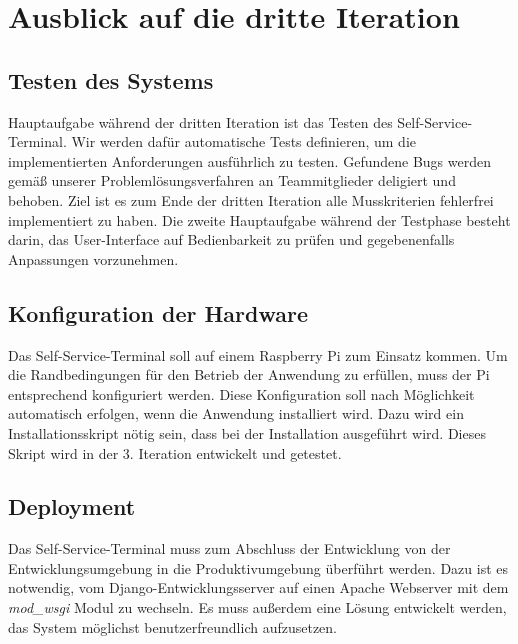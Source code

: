 \section{Ausblick auf die dritte Iteration}
\subsection{Testen des Systems}
Hauptaufgabe während der dritten Iteration ist das Testen des Self-Service-Terminal. Wir werden dafür automatische Tests definieren, um die implementierten Anforderungen ausführlich zu testen. Gefundene Bugs werden gemäß unserer Problemlösungsverfahren an Teammitglieder deligiert und behoben. Ziel ist es zum Ende der dritten Iteration alle Musskriterien fehlerfrei implementiert zu haben. Die zweite Hauptaufgabe während der Testphase besteht darin, das User-Interface auf Bedienbarkeit zu prüfen und gegebenenfalls Anpassungen vorzunehmen.\par
\vspace{0,5cm}
\subsection{Konfiguration der Hardware}
Das Self-Service-Terminal soll auf einem Raspberry Pi zum Einsatz kommen. Um die Randbedingungen für den Betrieb der Anwendung zu erfüllen, muss der Pi entsprechend konfiguriert werden. Diese Konfiguration soll nach Möglichkeit automatisch erfolgen, wenn die Anwendung installiert wird. Dazu wird ein Installationsskript nötig sein, dass bei der Installation ausgeführt wird. Dieses Skript wird in der 3. Iteration entwickelt und getestet. \par
\vspace{0,5cm}
\subsection{Deployment}
Das Self-Service-Terminal muss zum Abschluss der Entwicklung von der Entwicklungsumgebung in die Produktivumgebung überführt werden. Dazu ist es notwendig, vom Django-Entwicklungsserver auf einen Apache Webserver mit dem \textit{mod\_wsgi} Modul zu wechseln. Es muss außerdem eine Lösung entwickelt werden, das System möglichst benutzerfreundlich aufzusetzen.
